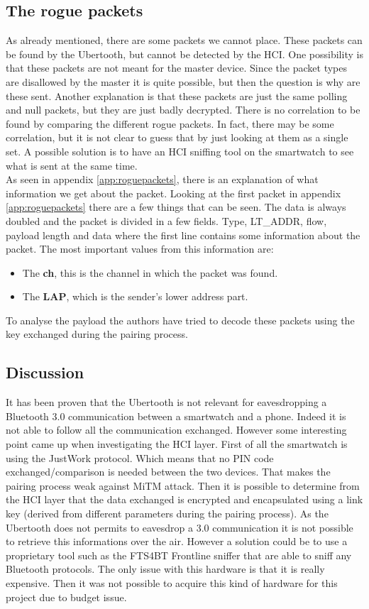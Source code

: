 \subsection{The rogue packets}
As already mentioned, there are some packets we cannot place. These packets can be found by the Ubertooth, but cannot be detected by the HCI. One possibility is that these packets are not meant for the master device. Since the packet types are disallowed by the master it is quite possible, but then the question is why are these sent. Another explanation is that these packets are just the same polling and null packets, but they are just badly decrypted.
There is no correlation to be found by comparing the different rogue packets. In fact, there may be some correlation, but it is not clear to guess that by just looking at them as a single set. A possible solution is to have an HCI sniffing tool on the smartwatch to see what is sent at the same time. \\
As seen in appendix \ref{app:roguepackets}, there is an explanation of what information we get about the packet.
Looking at the first packet in appendix \ref{app:roguepackets} there are a few things that can be seen. The data is always doubled and the packet is divided in a few fields. Type, LT\_ADDR, flow, payload length and data where the first line contains some information about the packet. The most important values from this information are:
\begin{itemize} 
\item The \textbf{ch}, this is the channel in which the packet was found.
\item The \textbf{LAP}, which is the sender's lower address part.
\end{itemize}

To analyse the payload the authors have tried to decode these packets using the key exchanged during the pairing process.

\subsection{Discussion}
It has been proven that the Ubertooth is not relevant for eavesdropping a Bluetooth 3.0 communication between a smartwatch and a phone. Indeed it is not able to follow all the communication exchanged. However some interesting point came up when investigating the HCI layer.
First of all the smartwatch is using the JustWork protocol. Which means that no PIN code exchanged/comparison is needed between the two devices. That makes the pairing process weak against MiTM attack.
Then it is possible to determine from the HCI layer that the data exchanged is encrypted and encapsulated using a link key (derived from different parameters during the pairing process). 
As the Ubertooth does not permits to eavesdrop a 3.0 communication it is not possible to retrieve this informations over the air. However a solution could be to use a proprietary tool such as the FTS4BT Frontline sniffer \cite{FTS4BT} that are able to sniff any Bluetooth protocols. The only issue with this hardware is that it is really expensive. Then it was not possible to acquire this kind of hardware for this project due to budget issue. 